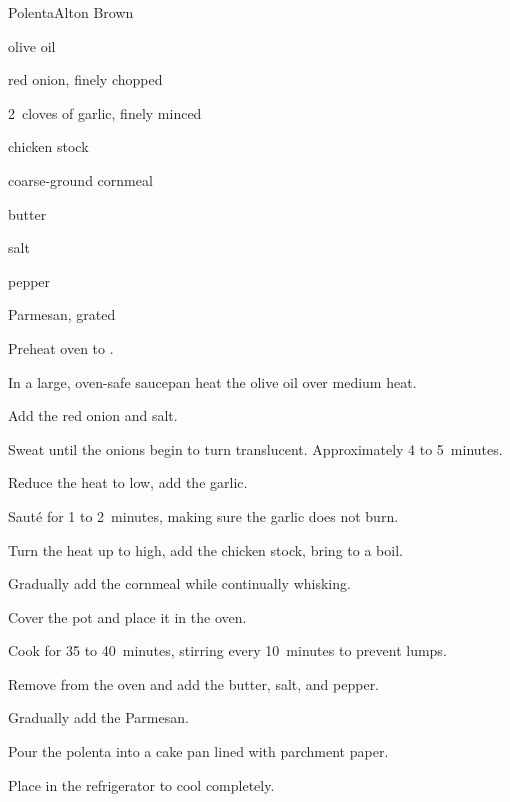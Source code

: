 \begin{recipe}{Polenta}{Alton Brown}{}

\begin{ingredients}
\item {} olive oil
\item \C{\threequarter} red onion, finely chopped
\item 2~cloves of garlic, finely minced
\item {} chicken stock
\item {} coarse-ground cornmeal
\item {} butter
\item \tp{1\half} salt
\item \tp{\quarter} pepper
\item \C{\third} Parmesan, grated
\end{ingredients}

\begin{directions}
\item Preheat oven to .
\item In a large, oven-safe saucepan heat the olive oil over medium heat.
\item Add the red onion and salt.
\item Sweat until the onions begin to turn translucent. Approximately 4 to 5~minutes.
\item Reduce the heat to low, add the garlic.
\item Sauté for 1 to 2~minutes, making sure the garlic does not burn.
\item Turn the heat up to high, add the chicken stock, bring to a boil.
\item Gradually add the cornmeal while continually whisking.
\item Cover the pot and place it in the oven.
\item Cook for 35 to 40~minutes, stirring every 10~minutes to prevent lumps.
\item Remove from the oven and add the butter, salt, and pepper.
\item Gradually add the Parmesan.
\item Pour the polenta into a cake pan lined with parchment paper.
\item Place in the refrigerator to cool completely.
\end{directions}
\end{recipe}
